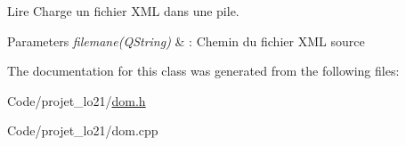 Lire Charge un fichier X\-M\-L dans une pile. 


\begin{DoxyParams}{Parameters}
{\em filemane(\-Q\-String)} & \-: Chemin du fichier X\-M\-L source \\
\hline
\end{DoxyParams}


The documentation for this class was generated from the following files\-:\begin{DoxyCompactItemize}
\item 
Code/projet\-\_\-lo21/\hyperlink{dom_8h}{dom.\-h}\item 
Code/projet\-\_\-lo21/dom.\-cpp\end{DoxyCompactItemize}
